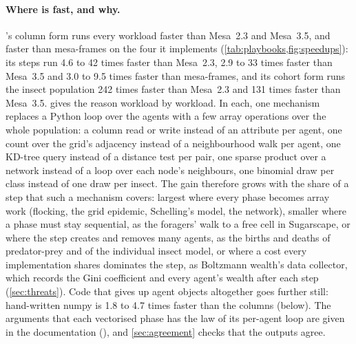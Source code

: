 \paragraph{Where \modelly{} is fast, and why.} \modelly{}'s column form runs every workload
faster than Mesa~2.3 and Mesa~3.5, and faster than mesa-frames on the four it implements
(\cref{tab:playbooks,fig:speedups}): its steps run
4.6 to 42 times faster than Mesa~2.3, 2.9 to 33 times faster than Mesa~3.5 and 3.0 to 9.5 times
faster than mesa-frames, and its cohort form runs the insect population 242 times faster than
Mesa~2.3 and 131 times faster than Mesa~3.5.  gives the reason workload by
workload. In each, one \modelly{} mechanism replaces a Python loop over the agents with a few
array operations over the whole population: a column read or write instead of an attribute per
agent, one count over the grid's adjacency instead of a neighbourhood walk per agent, one
KD-tree query instead of a distance test per pair, one sparse product over a network instead of
a loop over each node's neighbours, one binomial draw per class instead of one draw per insect.
The gain therefore grows with the share of a step that such a mechanism covers: largest where
every phase becomes array work (flocking, the grid epidemic, Schelling's model, the network),
smaller where a phase must stay sequential, as the foragers' walk to a free cell in Sugarscape,
or where the step creates and removes many agents, as the births and deaths of predator-prey
and of the individual insect model, or where a cost every implementation shares dominates the
step, as Boltzmann wealth's data collector, which records the Gini coefficient and every
agent's wealth after each step (\cref{sec:threats}). Code that gives up agent objects
altogether goes further still: hand-written numpy is 1.8 to 4.7 times faster than the columns
(below). The arguments that each vectorised phase has the law of its
per-agent loop are given in the documentation (), and
\cref{sec:agreement} checks that the outputs agree.

